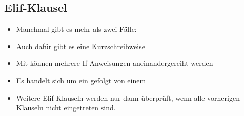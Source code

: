 \subsection{Elif-Klausel}

\begin{frame}
	\slidehead
	\begin{itemize}
		\item Manchmal gibt es mehr als zwei Fälle:
		\item Auch dafür gibt es eine Kurzschreibweise
	\end{itemize}
\end{frame}

\begin{frame}
	\slidehead

	\begin{itemize}
		\item Mit  können mehrere If-Anweisungen aneinandergereiht werden
		\item Es handelt sich um ein  gefolgt von einem 
		\item Weitere Elif-Klauseln werden nur dann überprüft, wenn alle vorherigen Klauseln nicht eingetreten sind.
	\end{itemize}
\end{frame}

\livecoding



